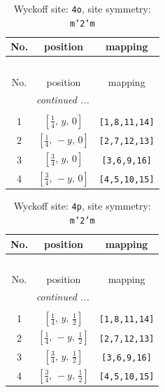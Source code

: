 \documentclass[fleqn,8pt]{jsarticle}
\begin{document}
\renewcommand{\arraystretch}{1.2}
\begin{longtable}{ccc}
\caption{Wyckoff site: {\tt 4o}, site symmetry: {\tt m'2'm}}
 \\
 \hline \hline
No. & position & mapping \\ \hline \endfirsthead

\multicolumn{2}{l}{\tablename\ \thetable{}} \\
 \hline \hline
No. & position & mapping \\ \hline \endhead

 \hline \hline
\multicolumn{2}{r}{\footnotesize\it continued ...} \\ \endfoot

 \hline \hline
\multicolumn{2}{r}{} \\ \endlastfoot

1 & $\left[ \frac{1}{4},\, y,\, 0 \right]$ & {\tt [1,8,11,14]} \\ \hline
2 & $\left[ \frac{1}{4},\, - y,\, 0 \right]$ & {\tt [2,7,12,13]} \\ \hline
3 & $\left[ \frac{3}{4},\, y,\, 0 \right]$ & {\tt [3,6,9,16]} \\ \hline
4 & $\left[ \frac{3}{4},\, - y,\, 0 \right]$ & {\tt [4,5,10,15]} \\
\end{longtable}
\renewcommand{\arraystretch}{1.2}
\begin{longtable}{ccc}
\caption{Wyckoff site: {\tt 4p}, site symmetry: {\tt m'2'm}}
 \\
 \hline \hline
No. & position & mapping \\ \hline \endfirsthead

\multicolumn{2}{l}{\tablename\ \thetable{}} \\
 \hline \hline
No. & position & mapping \\ \hline \endhead

 \hline \hline
\multicolumn{2}{r}{\footnotesize\it continued ...} \\ \endfoot

 \hline \hline
\multicolumn{2}{r}{} \\ \endlastfoot

1 & $\left[ \frac{1}{4},\, y,\, \frac{1}{2} \right]$ & {\tt [1,8,11,14]} \\ \hline
2 & $\left[ \frac{1}{4},\, - y,\, \frac{1}{2} \right]$ & {\tt [2,7,12,13]} \\ \hline
3 & $\left[ \frac{3}{4},\, y,\, \frac{1}{2} \right]$ & {\tt [3,6,9,16]} \\ \hline
4 & $\left[ \frac{3}{4},\, - y,\, \frac{1}{2} \right]$ & {\tt [4,5,10,15]} \\
\end{longtable}
\end{document}
